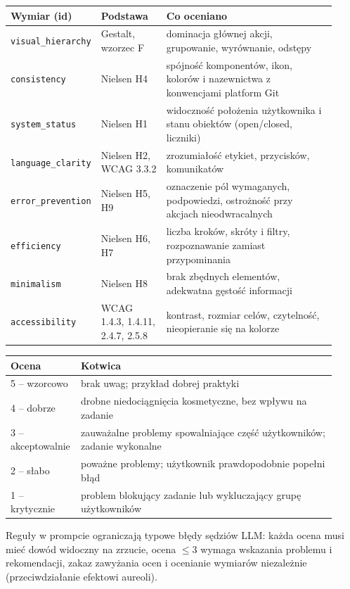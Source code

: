 \documentclass[11pt,a4paper]{article}
\begin{document}
\begin{longtable}{p{0.2\linewidth}p{0.2\linewidth}p{0.52\linewidth}}
\toprule \textbf{Wymiar (id)} & \textbf{Podstawa} & \textbf{Co oceniano} \\ \midrule \endhead
\texttt{visual\_hierarchy} & Gestalt, wzorzec F & dominacja głównej akcji, grupowanie, wyrównanie, odstępy \\
\texttt{consistency} & Nielsen H4 & spójność komponentów, ikon, kolorów i nazewnictwa z konwencjami platform Git \\
\texttt{system\_status} & Nielsen H1 & widoczność położenia użytkownika i stanu obiektów (open/closed, liczniki) \\
\texttt{language\_clarity} & Nielsen H2, WCAG 3.3.2 & zrozumiałość etykiet, przycisków, komunikatów \\
\texttt{error\_prevention} & Nielsen H5, H9 & oznaczenie pól wymaganych, podpowiedzi, ostrożność przy akcjach nieodwracalnych \\
\texttt{efficiency} & Nielsen H6, H7 & liczba kroków, skróty i filtry, rozpoznawanie zamiast przypominania \\
\texttt{minimalism} & Nielsen H8 & brak zbędnych elementów, adekwatna gęstość informacji \\
\texttt{accessibility} & WCAG 1.4.3, 1.4.11, 2.4.7, 2.5.8 & kontrast, rozmiar celów, czytelność, nieopieranie się na kolorze \\
\bottomrule
\end{longtable}

\begin{longtable}{p{0.15\linewidth}p{0.77\linewidth}}
\toprule \textbf{Ocena} & \textbf{Kotwica} \\ \midrule \endhead
5 -- wzorcowo & brak uwag; przykład dobrej praktyki \\
4 -- dobrze & drobne niedociągnięcia kosmetyczne, bez wpływu na zadanie \\
3 -- akceptowalnie & zauważalne problemy spowalniające część użytkowników; zadanie wykonalne \\
2 -- słabo & poważne problemy; użytkownik prawdopodobnie popełni błąd \\
1 -- krytycznie & problem blokujący zadanie lub wykluczający grupę użytkowników \\
\bottomrule
\end{longtable}

Reguły w prompcie ograniczają typowe błędy sędziów LLM: każda ocena musi mieć dowód widoczny na
zrzucie, ocena $\leq 3$ wymaga wskazania problemu i rekomendacji, zakaz zawyżania ocen i ocenianie
wymiarów niezależnie (przeciwdziałanie efektowi aureoli).
\end{document}
